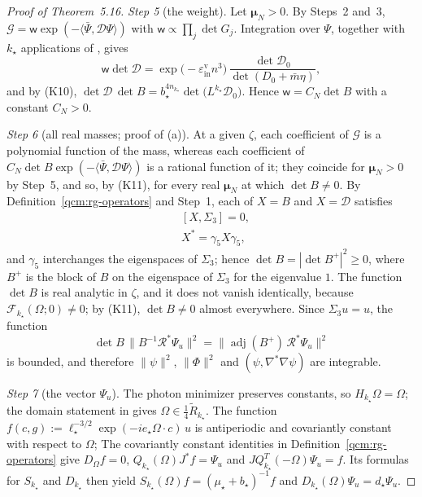 \documentclass[11pt,letterpaper,reqno]{amsart}
\theoremstyle{definition}
\begin{document}
\begin{proof}[Proof of Theorem~5.16]
\emph{Step 5} (the weight).
Let $\boldsymbol\mu_N>0$.
By Steps~2 and~3, $\mathcal G=\mathsf w\exp(-\langle\bar\Psi,\mathcal D\Psi\rangle)$ with $\mathsf w\propto\prod_j\det G_j$.
Integration over $\Psi$, together with $k_\star$ applications of \cite[equation~(13.20)]{QEDConstruction}, gives
\begin{equation*}
\mathsf w\det\mathcal D=\exp\bigl(-\varepsilon^{\mathrm v}_{\mathrm{in}}n^3\bigr)\,\frac{\det\mathcal D_0}{\det(D_0+\bar m\eta)},
\end{equation*}
and by (K10), $\det\mathcal D\,\allowbreak \det B=\allowbreak b_\star^{4n_{k_\star}}\det\bigl(L^{k_\star}\mathcal D_0\bigr)$.
Hence $\mathsf w=C_N\det B$ with a constant $C_N>0$.

\emph{Step 6} (all real masses; proof of (a)).
At a given $\zeta$, each coefficient of $\mathcal G$ is a polynomial function of the mass, whereas each coefficient of $C_N\det B\exp(-\langle\bar\Psi,\mathcal D\Psi\rangle)$ is a rational function of it;
they coincide for $\boldsymbol\mu_N>0$ by Step~5, and so, by (K11), for every real $\boldsymbol\mu_N$ at which $\det B\ne0$.
By Definition~\ref{qcm:rg-operators} and Step~1, each of $X=B$ and $X=\mathcal D$ satisfies
\begin{align}
&[X,\Sigma_3]=0,\tag{P1}\\
&X^*=\gamma_5X\gamma_5,\tag{P2}
\end{align}
and $\gamma_5$ interchanges the eigenspaces of $\Sigma_3$;
hence $\det B=|\det B^+|^2\ge0$, where $B^+$ is the block of $B$ on the eigenspace of $\Sigma_3$ for the eigenvalue $1$.
The function $\det B$ is real analytic in $\zeta$, and it does not vanish identically, because $\mathscr F_{k_\star}(\Omega;0)\ne0$;
by (K11), $\det B\ne0$ almost everywhere.
Since $\Sigma_3u=u$, the function
\begin{equation*}
\det B\,\|B^{-1}\mathcal R^*\Psi_u\|^2=\|\operatorname{adj}(B^+)\,\mathcal R^*\Psi_u\|^2
\end{equation*}
is bounded, and therefore $\|\psi\|^2$, $\|\Phi\|^2$ and $(\psi,\nabla^*\nabla\psi)$ are integrable.

\emph{Step 7} (the vector $\Psi_u$).
The photon minimizer preserves constants, so $H_{k_\star}\Omega=\Omega$; the domain statement in \cite[Proposition~10.4]{QEDConstruction} gives $\Omega\in\frac14\widetilde R_{k_\star}$.
The function $f(c,g):=\ell_\star^{-3/2}\exp(-ie_\star\Omega\cdot c)\,u$ is antiperiodic and covariantly constant with respect to $\Omega$;
The covariantly constant identities in Definition~\ref{qcm:rg-operators} give $D_\Omega f=0$, $Q_{k_\star}(\Omega)J^*f=\Psi_u$ and $JQ^T_{k_\star}(-\Omega)\Psi_u=f$. Its formulas for $S_{k_\star}$ and $D_{k_\star}$ then yield $S_{k_\star}(\Omega)f=(\mu_\star+b_\star)^{-1}f$ and $D_{k_\star}(\Omega)\Psi_u=d_\star\Psi_u$.


\end{proof}
\end{document}
